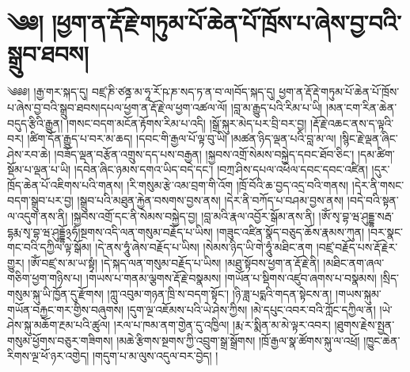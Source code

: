 \chapter{༄༅། །ཕྱག་ན་རྡོ་རྗེ་གཏུམ་པོ་ཆེན་པོ་ཁྲོས་པ་ཞེས་བྱ་བའི་སྒྲུབ་ཐབས།}༄༅༅། །རྒྱ་གར་སྐད་དུ། བཛྲ་ཎི་ཙནྜ་མ་ཧཱ་རོ་ཥ་ཎ་སད་ཏ་ན་བ་ལ།བོད་སྐད་དུ། ཕྱག་ན་རྡོ་རྡེ་གཏུམ་པོ་ཆེན་པོ་ཁྲོས་པ་ཞེས་བྱ་བའི་སྒྲུབ་ཐབས།དཔལ་ཕྱག་ན་རྡོ་རྗེ་ལ་ཕྱག་འཚལ་ལོ། །བླ་མ་རྒྱུད་པའི་རིམ་པ་ཡི། །མན་ངག་རིན་ཆེན་བདུད་རྩིའི་རྒྱུན། །གསང་བདག་མངོན་རྟོགས་རིམ་པ་འདི། །སྒྲོ་སྐུར་མེད་པར་བྲི་བར་བྱ། །རྡོ་རྗེ་འཆང་ནས་ད་ལྟའི་བར། །ཚིག་དོན་རྒྱུད་པ་བར་མ་ཆད། །དབང་གི་རྒྱལ་པོ་ལྟ་བུ་ཡི། །མཚན་ཉིད་ལྡན་པའི་བླ་མ་ལ། །སྙིང་རྗེ་ལྡན་ཞིང་ཤེས་རབ་ཆེ། །བཟོད་ལྡན་བརྩོན་འགྲུས་དད་པས་བརྒྱན། །སྐྱབས་འགྲོ་སེམས་བསྐྱེད་དབང་ཐོབ་ཅིང་། །དམ་ཚིག་སྡོམ་པ་ལྡན་པ་ཡི། །དབེན་ཞིང་ཉམས་དགའ་ཡིད་བདེ་དང་། །བཀྲ་ཤིས་དཔལ་འཕེལ་དབང་དབང་འཛིན། །དུར་ཁྲོད་ཆེན་པོ་འཇིགས་པའི་གནས། །རི་གསུམ་རྩེ་འམ་བྲག་གི་འོག །ཁྲོ་བོའི་ཆ་བྱད་འདྲ་བའི་གནས། །དེར་ནི་གསང་བདག་སྒྲུབ་པར་བྱ། །སྒྲུབ་པའི་མཐུན་རྐྱེན་བསགས་བྱས་ནས། །དེར་ནི་བཀོད་པ་བཤམ་བྱས་ནས། །བདེ་བའི་སྟན་ལ་འདུག་ནས་ནི། །སྐྱབས་འགྲོ་དང་ནི་སེམས་བསྐྱེད་བྱ། །བླ་མའི་རྣལ་འབྱོར་སྒོམ་ནས་ནི། །ཨོཾ་སྭ་བྷ་ཝ་ཤུདྡྷ་སརྦ་དྷརྨ་སྭ་བྷ་ཝ་ཤུདྡྷོ྅ཧཾ།སྔགས་འདི་ལན་གསུམ་བརྗོད་པ་ཡིས། །གཟུང་འཛིན་སྣོད་བཅུད་ཆོས་རྣམས་ཀུན། །བར་སྣང་གང་བའི་དཀྱིལ་ལྟ་སྒོམ། །དེ་ནས་ཧཱུཾ་ཞེས་བརྗོད་པ་ཡིས། །སེམས་ཉིད་ཡི་གེ་ཧཱུཾ་མཐིང་ནག །བཛྲ་བརྗོད་པས་རྡོ་རྗེར་གྱུར། །ཨོཾ་བཛྲ་ས་མ་ཡ་སྟྭཾ། །དེ་སྐད་ལན་གསུམ་བརྗོད་པ་ཡིས། །མཐུ་སྟོབས་ཕྱག་ན་རྡོ་རྗེ་ནི། །མཐིང་ནག་ཞལ་གཅིག་ཕྱག་གཉིས་པ། །གཡས་པ་གནམ་ལྕགས་རྡོ་རྗེ་བསྣམས། །གཡོན་པ་སྡིགས་འཛུབ་ཞགས་པ་བསྣམས། །སྲིད་གསུམ་སྐུ་ཡི་ཁྱོན་དུ་རྫོགས། །ཀླུ་འབུམ་གཉན་ཁྲི་ས་བདག་སྟོང་། །ཉི་ཟླ་པདྨའི་གདན་སྟེངས་ན། །གཡས་སྐུམ་གཡོན་བརྐྱང་གར་གྱིས་བཞུགས། །དུག་ལྔ་འཇོམས་པའི་ཡེ་ཤེས་ཀྱིས། །མེ་དཔུང་འབར་བའི་ཀློང་དཀྱིལ་ན། །ཡེ་ཤེས་སྐུ་མཆོག་རྔམ་པའི་ཚུལ། །རལ་པ་ཁམ་ནག་གྱེན་དུ་འཁྱིལ། །རྨ་ར་སྨིན་མ་མེ་ལྟར་འབར། །ཐུགས་རྗེས་སྤྱན་གསུམ་ཕྱོགས་བཅུར་གཟིགས། །མཆེ་རྩིགས་སྔགས་ཀྱི་འབྲུག་སྒྲ་སྒྲོགས། །ཁྲོ་རྒྱལ་སྣ་ཚོགས་སྐུ་ལ་འཕྲོ། །ཁྱུང་ཆེན་རིགས་ལྔ་ཕོ་ཉར་འགྱེད། །གདུག་པ་མ་ལུས་འདུལ་བར་བྱེད། །
